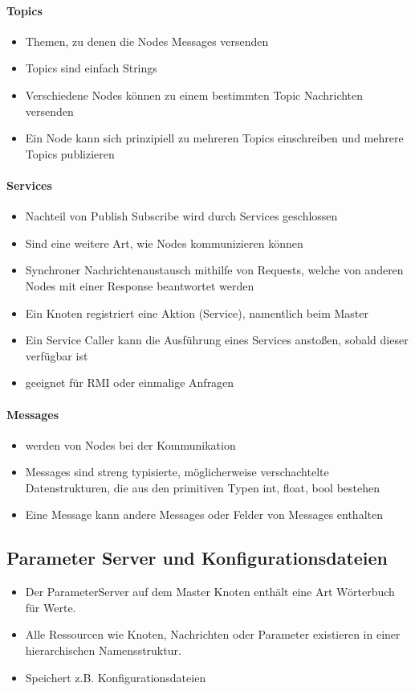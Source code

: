 \paragraph{Topics}
\begin{itemize}
	\item Themen, zu denen die Nodes Messages versenden
	\item Topics sind einfach Strings
	\item Verschiedene Nodes können zu einem bestimmten Topic Nachrichten versenden
	\item Ein Node kann sich prinzipiell zu mehreren Topics einschreiben und mehrere Topics publizieren
\end{itemize}
\paragraph{Services}
\begin{itemize}
	\item Nachteil von Publish Subscribe wird durch Services geschlossen
	\item Sind eine weitere Art, wie Nodes kommunizieren können
	\item Synchroner Nachrichtenaustausch mithilfe von Requests, welche von anderen Nodes mit einer Response beantwortet werden
	\item Ein Knoten registriert eine Aktion (Service), namentlich beim Master
	\item Ein Service Caller kann die Ausführung eines Services anstoßen, sobald dieser verfügbar ist
	\item geeignet für RMI oder einmalige Anfragen
\end{itemize}
\paragraph{Messages}
\begin{itemize}
	\item werden von Nodes bei der Kommunikation
	\item Messages sind streng typisierte, möglicherweise verschachtelte Datenstrukturen, die aus den primitiven Typen int, float, bool bestehen
	\item Eine Message kann andere Messages oder Felder von Messages enthalten
\end{itemize}
\subsection{Parameter Server und Konfigurationsdateien}
\begin{itemize}
	\item Der ParameterServer auf dem Master Knoten enthält eine Art Wörterbuch für Werte.
	\item Alle Ressourcen wie Knoten, Nachrichten oder Parameter existieren in einer hierarchischen Namensstruktur.
	\item Speichert z.B. Konfigurationsdateien
\end{itemize}



